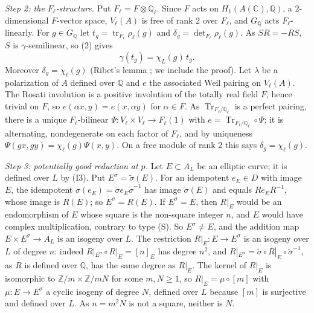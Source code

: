 \documentclass[11pt]{article}
\newcommand{\Q}{\mathbb Q}
\newcommand{\Z}{\mathbb Z}
\DeclareMathOperator{\tr}{tr}
\DeclareMathOperator{\Tr}{Tr}
\begin{document}
\emph{Step 2: the \(F_\ell\)-structure.} Put \(F_\ell=F\otimes\Q_\ell\). Since \(F\) acts on
\(H_1(A(\mathbb C),\Q)\), a \(2\)-dimensional \(F\)-vector space, \(V_\ell(A)\) is free of rank \(2\) over
\(F_\ell\), and \(G_{\Q}\) acts \(F_\ell\)-linearly. For \(g\in G_{\Q}\) let \(t_g=\tr_{F_\ell}\rho_\ell(g)\) and
\(\delta_g=\det_{F_\ell}\rho_\ell(g)\). As \(SR=-RS\), \(S\) is \(\gamma\)-semilinear, so (2) gives
\[\gamma(t_g)=\chi_L(g)\,t_g .\tag{3}\]
Moreover \(\delta_g=\chi_\ell(g)\) (Ribet's lemma \cite{Ri}; we include the proof). Let \(\lambda\) be a
polarization of \(A\) defined over \(\Q\) and \(e\) the associated Weil pairing on \(V_\ell(A)\). The Rosati
involution is a positive involution of the totally real field \(F\), hence trivial on \(F\), so
\(e(\alpha x,y)=e(x,\alpha y)\) for \(\alpha\in F\). As \(\Tr_{F_\ell/\Q_\ell}\) is a perfect pairing, there is a
unique \(F_\ell\)-bilinear \(\Psi\colon V_\ell\times V_\ell\to F_\ell(1)\) with
\(e=\Tr_{F_\ell/\Q_\ell}\circ\Psi\); it is alternating, nondegenerate on each factor of \(F_\ell\), and by uniqueness
\(\Psi(gx,gy)=\chi_\ell(g)\Psi(x,y)\). On a free module of rank \(2\) this says \(\delta_g=\chi_\ell(g)\).

\emph{Step 3: potentially good reduction at \(p\).} Let \(E\subset A_L\) be an elliptic curve; it is defined over
\(L\) by (I3). Put \(E^\sigma=\tilde\sigma(E)\). For an idempotent \(e_E\in D\) with image \(E\), the idempotent
\(\sigma(e_E)=\tilde\sigma e_E\tilde\sigma^{-1}\) has image \(\tilde\sigma(E)\) and equals \(Re_ER^{-1}\), whose image
is \(R(E)\); so \(E^\sigma=R(E)\). If \(E^\sigma=E\), then \(R|_E\) would be an endomorphism of \(E\) whose square is
the non-square integer \(n\), and \(E\) would have complex multiplication, contrary to type (S). So
\(E^\sigma\neq E\), and the addition map \(E\times E^\sigma\to A_L\) is an isogeny over \(L\). The restriction
\(R|_E\colon E\to E^\sigma\) is an isogeny over \(L\) of degree \(n\): indeed \(R|_{E^\sigma}\circ R|_E=[n]_E\) has
degree \(n^2\), and \(R|_{E^\sigma}=\tilde\sigma\circ R|_E\circ\tilde\sigma^{-1}\), as \(R\) is defined over \(\Q\),
has the same degree as \(R|_E\). The kernel of \(R|_E\) is isomorphic to \(\Z/m\times\Z/mN\) for some \(m,N\ge1\),
so \(R|_E=\mu\circ[m]\) with \(\mu\colon E\to E^\sigma\) a cyclic isogeny of degree \(N\), defined over \(L\) because
\([m]\) is surjective and defined over \(L\). As \(n=m^2N\) is not a square, neither is \(N\).
\end{document}
